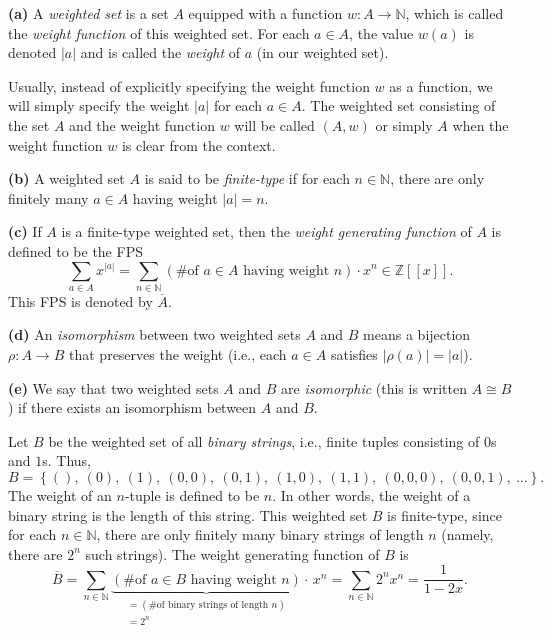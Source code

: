 \begin{definition}
\label{def.gf-ws.weighted-sets}\textbf{(a)} A \emph{weighted set} is a set $A$
equipped with a function $w:A\rightarrow\mathbb{N}$, which is called the
\emph{weight function} of this weighted set. For each $a\in A$, the value
$w\left(  a\right)  $ is denoted $\left\vert a\right\vert $ and is called the
\emph{weight} of $a$ (in our weighted set). \medskip

Usually, instead of explicitly specifying the weight function $w$ as a
function, we will simply specify the weight $\left\vert a\right\vert $ for
each $a\in A$. The weighted set consisting of the set $A$ and the weight
function $w$ will be called $\left(  A,w\right)  $ or simply $A$ when the
weight function $w$ is clear from the context. \medskip

\textbf{(b)} A weighted set $A$ is said to be \emph{finite-type} if for each
$n\in\mathbb{N}$, there are only finitely many $a\in A$ having weight
$\left\vert a\right\vert =n$. \medskip

\textbf{(c)} If $A$ is a finite-type weighted set, then the \emph{weight
generating function} of $A$ is defined to be the FPS%
\[
\sum_{a\in A}x^{\left\vert a\right\vert }=\sum_{n\in\mathbb{N}}\left(
\text{\# of }a\in A\text{ having weight }n\right)  \cdot x^{n}\in
\mathbb{Z}\left[  \left[  x\right]  \right]  .
\]
This FPS is denoted by $\overline{A}$. \medskip

\textbf{(d)} An \emph{isomorphism} between two weighted sets $A$ and $B$ means
a bijection $\rho:A\rightarrow B$ that preserves the weight (i.e., each $a\in
A$ satisfies $\left\vert \rho\left(  a\right)  \right\vert =\left\vert
a\right\vert $). \medskip

\textbf{(e)} We say that two weighted sets $A$ and $B$ are \emph{isomorphic}
(this is written $A\cong B$) if there exists an isomorphism between $A$ and
$B$.
\end{definition}

\begin{example}
\label{exa.ws.bin-string1}Let $B$ be the weighted set of all \emph{binary
strings}, i.e., finite tuples consisting of $0$s and $1$s. Thus,%
\[
B=\left\{  \left(  {}\right)  ,\ \left(  0\right)  ,\ \left(  1\right)
,\ \left(  0,0\right)  ,\ \left(  0,1\right)  ,\ \left(  1,0\right)
,\ \left(  1,1\right)  ,\ \left(  0,0,0\right)  ,\ \left(  0,0,1\right)
,\ \ldots\right\}  .
\]
The weight of an $n$-tuple is defined to be $n$. In other words, the weight of
a binary string is the length of this string. This weighted set $B$ is
finite-type, since for each $n\in\mathbb{N}$, there are only finitely many
binary strings of length $n$ (namely, there are $2^{n}$ such strings). The
weight generating function of $B$ is%
\[
\overline{B}=\sum_{n\in\mathbb{N}}\underbrace{\left(  \text{\# of }a\in
B\text{ having weight }n\right)  }_{\substack{=\left(  \text{\# of binary
strings of length }n\right)  \\=2^{n}}}\cdot\,x^{n}=\sum_{n\in\mathbb{N}}%
2^{n}x^{n}=\dfrac{1}{1-2x}.
\]

\end{example}

